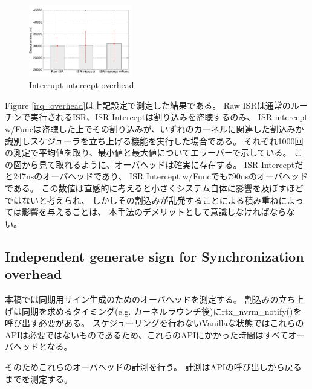 \begin{figure}[t]
\begin{center}
\includegraphics[width=0.4\textwidth]{img/interrupt.pdf}
\caption{Interrupt intercept overhead}
\end{center}
\label{fig:irq_overhead}
\end{figure}

Figure \ref{irq_overhead}は上記設定で測定した結果である。
Raw ISRは通常のルーチンで実行されるISR、ISR Interceptは割り込みを盗聴するのみ、
ISR intercept w/Funcは盗聴した上でその割り込みが、いずれのカーネルに関連した割込みか識別しスケジューラを立ち上げる機能を実行した場合である。
それぞれ1000回の測定で平均値を取り、最小値と最大値についてエラーバーで示している。
この図から見て取れるように、オーバヘッドは確実に存在する。
ISR Interceptだと247nsのオーバヘッドであり、
ISR Intercept w/Funcでも790nsのオーバヘッドである。
この数値は直感的に考えると小さくシステム自体に影響を及ぼすほどではないと考えられ、
しかしその割込みが乱発することによる積み重ねによっては影響を与えることは、
本手法のデメリットとして意識しなければならない。


\subsection{Independent generate sign for Synchronization overhead}
本稿では同期用サイン生成のためのオーバヘッドを測定する。
割込みの立ち上げは同期を求めるタイミング(e.g. カーネルラウンチ後)にrtx\_nvrm\_notify()を呼び出す必要がある。
スケジューリングを行わないVanillaな状態ではこれらのAPIは必要ではないものであるため、これらのAPIにかかった時間はすべてオーバヘッドとなる。

そのためこれらのオーバヘッドの計測を行う。
計測はAPIの呼び出しから戻るまでを測定する。

